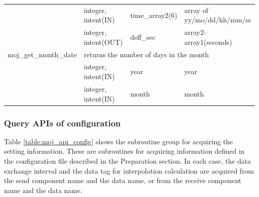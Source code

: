 \documentclass[11pt,a4paper]{report}
\newcommand{\tabref}[1]{Table \ref{#1}}
\begin{document}
\begin{table}[H]
\begin{center}
{\begin{tabular}{llll}
           & integer, intent(IN) & time\_array2(6) & array of yy/mo/dd/hh/mm/ss\\
           & integer, intent(OUT) & deff\_sec & array2-array1(seconds) \\
\hline
 moj\_get\_month\_date &  \multicolumn{3}{l}{returns the number of days in the month}\\
           & integer, intent(IN) & year & year \\
           & integer, intent(IN) & month   & month \\
\hline\hline
\end{tabular}
}
\end{center}
\end{table}

\subsubsection{Query APIs of configuration}
\tabref{table:moj_api_config} shows the subroutine group for acquiring the setting information.
These are subroutines for acquiring information defined in the configuration file described in the Preparation section.
In each case, the data exchange interval and the data tag for interpolation calculation are acquired from the send component name and the data name, or from the receive component name and the data name.
\end{document}
